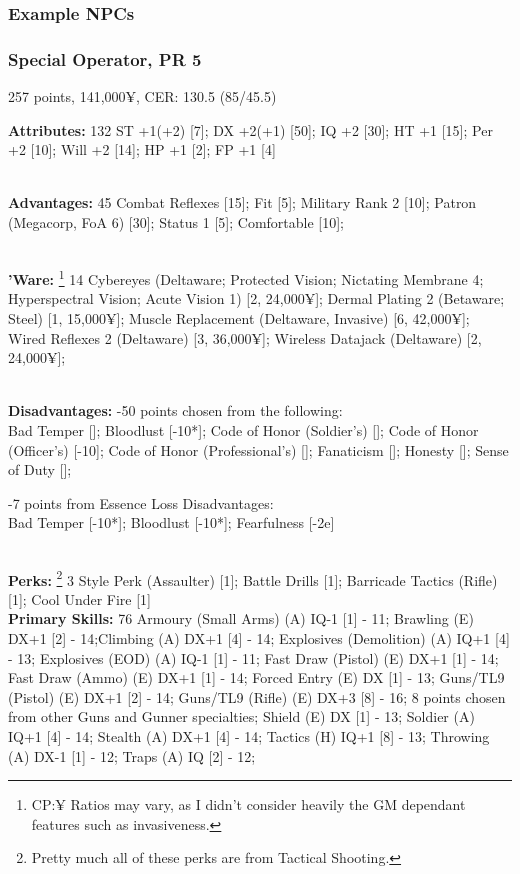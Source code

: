 \begin{multicols*}{2}
	\subsubsection{Example NPCs}
	
	\subsubsection*{Special Operator, PR 5}
	\begin{flushright}
		257 points, 141,000¥, CER: 130.5 (85/45.5)
	\end{flushright}
	
	\textbf{Attributes: } 132
	ST +1(+2) [7]; DX +2(+1) [50]; IQ +2 [30]; HT +1 [15]; Per +2 [10]; Will +2 [14]; HP +1 [2]; FP +1 [4]
	
	\textbf{\\Advantages: } 45
	Combat Reflexes [15]; Fit [5]; Military Rank 2 [10]; Patron (Megacorp, FoA 6) [30]; Status 1 [5]; Comfortable [10];
	
	\textbf{\\'Ware: }\footnote{CP:¥ Ratios may vary, as I didn't consider heavily the GM dependant features such as invasiveness.} 14
	Cybereyes (Deltaware; Protected Vision; Nictating Membrane 4; Hyperspectral Vision; Acute Vision 1) [2, 24,000¥]; Dermal Plating 2 (Betaware; Steel) [1, 15,000¥]; Muscle Replacement (Deltaware, Invasive) [6, 42,000¥]; Wired Reflexes 2 (Deltaware) [3, 36,000¥]; Wireless Datajack (Deltaware) [2, 24,000¥];
	
	\textbf{\\Disadvantages: }
	-50 points chosen from the following:\\
	Bad Temper []; Bloodlust [-10*]; Code of Honor (Soldier's) []; Code of Honor (Officer's) [-10]; Code of Honor (Professional's) []; Fanaticism []; Honesty []; Sense of Duty [];
	
	-7 points from Essence Loss Disadvantages:\\
	Bad Temper [-10*]; Bloodlust [-10*]; Fearfulness [-2e]
	
	\textbf{\\Perks: }\footnote{Pretty much all of these perks are from Tactical Shooting.} 3 
	Style Perk (Assaulter) [1]; Battle Drills [1]; Barricade Tactics (Rifle) [1]; Cool Under Fire [1]\\
	
	\textbf{Primary Skills: } 76
	Armoury (Small Arms) (A) IQ-1 [1] - 11; Brawling (E) DX+1 [2] - 14;Climbing (A) DX+1 [4] - 14; Explosives (Demolition) (A) IQ+1 [4] - 13; Explosives (EOD) (A) IQ-1 [1] - 11; Fast Draw (Pistol) (E) DX+1 [1] - 14; Fast Draw (Ammo) (E) DX+1 [1] - 14; Forced Entry (E) DX [1] - 13; Guns/TL9 (Pistol) (E) DX+1 [2] - 14; Guns/TL9 (Rifle) (E) DX+3 [8] - 16; 8 points chosen from other Guns and Gunner specialties; Shield (E) DX [1] - 13; Soldier (A) IQ+1 [4] - 14; Stealth (A) DX+1 [4] - 14; Tactics (H) IQ+1 [8] - 13; Throwing (A) DX-1 [1] - 12; Traps (A) IQ [2] - 12; \\
	

\end{multicols*}
